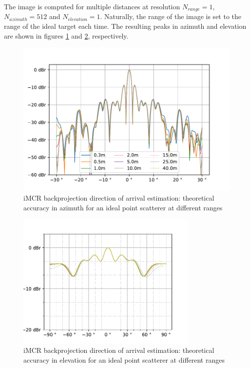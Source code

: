 The image is computed for multiple distances at resolution
$N_{range} = 1$, ${N_{azimuth} = 512}$ and $N_{elevation} = 1$.
Naturally, the range of the image is set to the range of the ideal target each time.
The resulting peaks in azimuth and elevation are shown in figures \ref{fig:bp_azm_peak} and \ref{fig:bp_elv_peak}, respectively.
\begin{figure}
    \centering
    \includegraphics[width=\textwidth]{../figures/bp_azm_peak.pdf}
    \caption{iMCR backprojection direction of arrival estimation: theoretical accuracy in azimuth for an ideal point scatterer at different ranges}
    \label{fig:bp_azm_peak}
\end{figure}

\begin{figure}
    \centering
    \includegraphics[width=0.8\textwidth]{../figures/bp_elv_peak.pdf}
    \caption{iMCR backprojection direction of arrival estimation: theoretical accuracy in elevation for an ideal point scatterer at different ranges}
    \label{fig:bp_elv_peak}
\end{figure}

